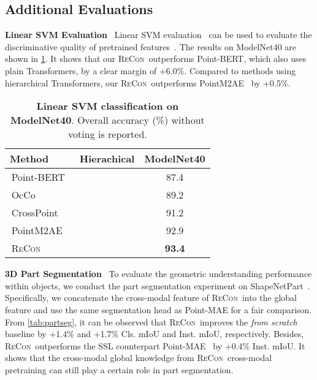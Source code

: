 \documentclass{article}
\theoremstyle{plain}
\theoremstyle{definition}
\theoremstyle{remark}
\def\recon{{\scshape ReCon}}
\newcommand{\reconcolor}[1]{\textcolor{reconcolor}{#1}}
\newcommand{\vitcolor}[1]{\textcolor{vitcolor}{#1}}
\newcommand{\br}{\reconcolor{\,}} \newcommand{\bv}{\vitcolor{\,}}  \newcommand{\bs}{\vitcolor{\,}} \newcommand{\bh}{\reconcolor{\,}}
\begin{document}
\subsection{Additional Evaluations}\label{app:add_eva}
\vspace{-5pt}
\textbf{Linear SVM Evaluation}~
Linear SVM evaluation~\citep{MarginSVM92,SLTheory98} can be used to evaluate the discriminative quality of pretrained features~\citep{BenchmarkSSL19}. The results on ModelNet40 are shown in \cref{tab:linear}. It shows that our \recon\ outperforms Point-BERT, which also uses plain Transformers, by a clear margin of +6.0\%. 
Compared to methods using hierarchical Transformers, our \recon\ outperforms PointM2AE~\citep{PointM2AE22} by +0.5\%.
\begin{table}[h!]
\vspace{-10pt}
\caption{\textbf{Linear SVM classification on ModelNet40}. Overall accuracy (\%) without voting is reported.} \label{tab:linear}
\begin{center}
\begin{tabular}{lcc}
\toprule[0.95pt]
Method & Hierachical & ModelNet40\\
\midrule[0.6pt]
\bv Point-BERT~\citep{PointBERT} &  & 87.4\\
\bs OcCo~\citep{OcCo} &  & 89.2\\
\bs CrossPoint~\citep{CrossPoint22} &  & 91.2\\
\bh PointM2AE~\citep{PointM2AE22} &  & 92.9\\
\rowcolor{linecolor}\br \recon  &  & \textbf{93.4}\\
\bottomrule[0.95pt]
\end{tabular}
\end{center}
\vspace{-10pt}
\end{table} 
\textbf{3D Part Segmentation}~
To evaluate the geometric understanding performance within objects, we conduct the part segmentation experiment on ShapeNetPart~\citep{ShapeNetPart16}. 
Specifically, we concatenate the cross-modal feature of \recon\ into the global feature and use the same segmentation head as Point-MAE for a fair comparison. 
From \cref{tab:partseg}, it can be observed that \recon\ improves the \textit{from scratch} baseline by +1.4\% and +1.7\% Cls. mIoU and Inst. mIoU, respectively. 
Besides, \recon\ outperforms the SSL counterpart Point-MAE~\citep{PointMAE} by +0.4\% Inst. mIoU. 
It shows that the cross-modal global knowledge from \recon~cross-modal pretraining can still play a certain role in part segmentation.
\end{document}
